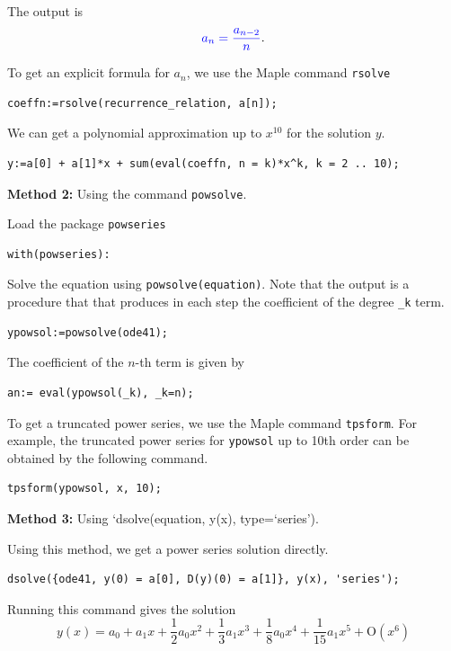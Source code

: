 \documentclass[
  12pt]{elegantbook}
\begin{document}
\begin{solution}
The output is
\[{\color{blue}a_{n} = \frac{a_{n -2}}{n}}.\]

To get an explicit formula for \(a_n\), we use the Maple command \texttt{rsolve}

\begin{verbatim}
coeffn:=rsolve(recurrence_relation, a[n]);
\end{verbatim}

We can get a polynomial approximation up to \(x^{10}\) for the solution \(y\).

\begin{verbatim}
y:=a[0] + a[1]*x + sum(eval(coeffn, n = k)*x^k, k = 2 .. 10);
\end{verbatim}

\textbf{Method 2:} Using the command \texttt{powsolve}.

Load the package \texttt{powseries}

\begin{verbatim}
with(powseries):
\end{verbatim}

Solve the equation using \texttt{powsolve(equation)}. Note that the output is a procedure that that produces in each step the coefficient of the degree \texttt{\_k} term.

\begin{verbatim}
ypowsol:=powsolve(ode41);
\end{verbatim}

The coefficient of the \(n\)-th term is given by

\begin{verbatim}
an:= eval(ypowsol(_k), _k=n);
\end{verbatim}

To get a truncated power series, we use the Maple command \texttt{tpsform}. For example, the truncated power series for \texttt{ypowsol} up to 10th order can be obtained by the following command.

\begin{verbatim}
tpsform(ypowsol, x, 10);
\end{verbatim}

\textbf{Method 3:} Using `dsolve(equation, y(x), type=`series').

Using this method, we get a power series solution directly.

\begin{verbatim}
dsolve({ode41, y(0) = a[0], D(y)(0) = a[1]}, y(x), 'series');
\end{verbatim}

Running this command gives the solution
\[y\left(x \right) = a_{0}+a_{1} x +\frac{1}{2} a_{0} x^{2}+\frac{1}{3} a_{1} x^{3}+\frac{1}{8} a_{0} x^{4}+\frac{1}{15} a_{1} x^{5}+\mathrm{O}\left(x^{6}\right)\]
\end{solution}
\end{document}
